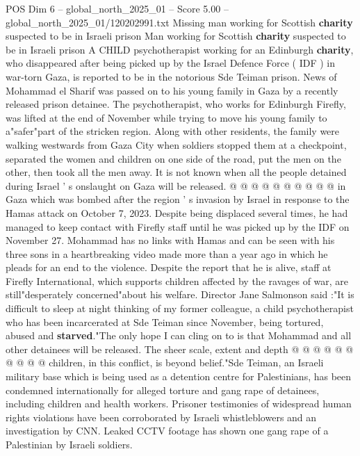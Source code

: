 \begin{textsample}{POS Dim 6 – global\_north\_2025\_01 – Score 5.00 – global\_north\_2025\_01/120202991.txt}  \label{ex:f6_pos_343}
Missing man working for Scottish \textbf{charity} suspected to be in Israeli prison Man working for Scottish \textbf{charity} suspected to be in Israeli prison A CHILD psychotherapist working for an Edinburgh \textbf{charity}, who disappeared after being picked up by the Israel Defence Force ( IDF ) in war-torn Gaza, is reported to be in the notorious Sde Teiman prison.
News of Mohammad el Sharif was passed on to his young family in Gaza by a recently released prison detainee.
The psychotherapist, who works for Edinburgh Firefly, was lifted at the end of November while trying to move his young family to a"safer"part of the stricken region.
Along with other residents, the family were walking westwards from Gaza City when soldiers stopped them at a checkpoint, separated the women and children on one side of the road, put the men on the other, then took all the men away.
It is not known when all the people detained during Israel ' s onslaught on Gaza will be released. @ @ @ @ @ @ @ @ @ @ in Gaza which was bombed after the region ' s invasion by Israel in response to the Hamas attack on October 7, 2023.
Despite being displaced several times, he had managed to keep contact with Firefly staff until he was picked up by the IDF on November 27.
Mohammad has no links with Hamas and can be seen with his three sons in a heartbreaking video made more than a year ago in which he pleads for an end to the violence.
Despite the report that he is alive, staff at Firefly International, which supports children affected by the ravages of war, are still"desperately concerned"about his welfare.
Director Jane Salmonson said :"It is difficult to sleep at night thinking of my former colleague, a child psychotherapist who has been incarcerated at Sde Teiman since November, being tortured, abused and \textbf{starved}."The only hope I can cling on to is that Mohammad and all other detainees will be released.
The sheer scale, extent and depth @ @ @ @ @ @ @ @ @ @ children, in this conflict, is beyond belief."Sde Teiman, an Israeli military base which is being used as a detention centre for Palestinians, has been condemned internationally for alleged torture and gang rape of detainees, including children and health workers.
Prisoner testimonies of widespread human rights violations have been corroborated by Israeli whistleblowers and an investigation by CNN.
Leaked CCTV footage has shown one gang rape of a Palestinian by Israeli soldiers.

\end{textsample}
